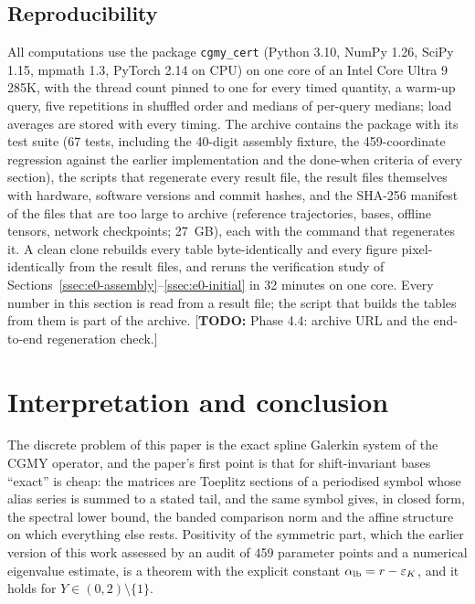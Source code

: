 \documentclass[11pt]{amsart}
\theoremstyle{remark}
\newcommand{\rf}{r}
\newcommand{\todo}[1]{\textcolor{red!70!black}{[\textbf{TODO:} #1]}}
\begin{document}
\subsection{Reproducibility}
\label{ssec:archive}
All computations use the package \texttt{cgmy\_cert} (Python 3.10, NumPy 1.26, SciPy 1.15, mpmath
1.3, PyTorch 2.14 on CPU) on one core of an Intel Core Ultra 9 285K, with the thread count pinned to
one for every timed quantity, a warm-up query, five repetitions in shuffled order and medians of
per-query medians; load averages are stored with every timing.  The archive contains the package
with its test suite (67 tests, including the 40-digit assembly fixture, the 459-coordinate
regression against the earlier implementation and the done-when criteria of every section), the
scripts that regenerate every result file, the result files themselves with hardware, software
versions and commit hashes, and the SHA-256 manifest of the files that are too large to archive
(reference trajectories, bases, offline tensors, network checkpoints; 27~GB), each with the command
that regenerates it.  A clean clone rebuilds every table byte-identically and every figure
pixel-identically from the result files, and reruns the verification study of
Sections~\ref{ssec:e0-assembly}--\ref{ssec:e0-initial} in 32 minutes on one core.  Every number
in this section is read from a result file; the script that builds the tables from them is part of
the archive.  \todo{Phase 4.4: archive URL and the end-to-end regeneration check.}
\FloatBarrier

\section{Interpretation and conclusion}
\label{sec:conclusion}\label{sec:discussion}
The discrete problem of this paper is the exact spline Galerkin system of the CGMY operator, and
the paper's first point is that for shift-invariant bases ``exact'' is cheap: the matrices are
Toeplitz sections of a periodised symbol whose alias series is summed to a stated tail, and the
same symbol gives, in closed form, the spectral lower bound, the banded comparison norm and the
affine structure on which everything else rests.  Positivity of the symmetric part, which the
earlier version of this work assessed by an audit of 459 parameter points and a numerical
eigenvalue estimate, is a theorem with the explicit constant $\alpha_{\rm lb}=\rf-\varepsilon_K$,
and it holds for $Y\in(0,2)\setminus\{1\}$.
\end{document}
